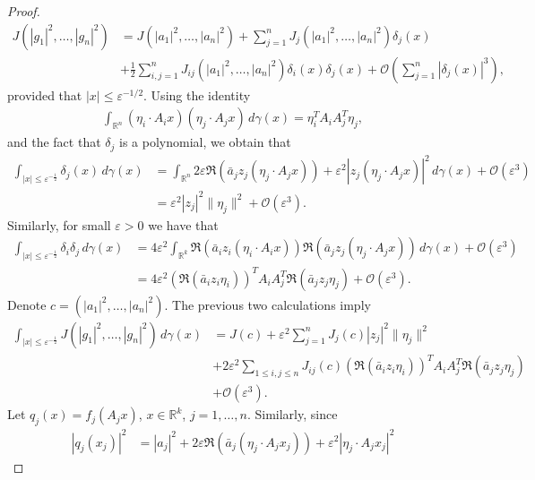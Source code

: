 \documentclass[10pt,a4paper]{amsart}
\newcommand{\R}{\mathbb{R}}
\begin{document}
\begin{proof}
		\begin{align*}
			J(|g_1|^2,\ldots,|g_n|^2)&= J(|a_1|^2,\ldots,|a_n|^2)  +\sum_{j=1}^n J_j(|a_1|^2,\ldots,|a_n|^2) \delta_j(x) \\
			&+ \frac{1}{2} \sum_{ i,j=1}^{n} J_{ij}(|a_1|^2,\ldots,|a_n|^2) \delta_i(x)\delta_j(x) + \mathcal{O}(\sum_{j=1}^n|\delta_j(x)|^3),   
		\end{align*}
		provided that $|x|\leq \varepsilon^{-1/2}$. Using the identity 
		\begin{align*}
			\int_{\R^n}(\eta_i\cdot A_ix)( \eta_j\cdot A_jx)\,d\gamma(x)=\eta_i^TA_iA_j^T \eta_j,
		\end{align*}
		and the fact that $\delta_j$ is a polynomial, we obtain that
		\begin{align*}
			\int_{| x|\leq \varepsilon^{-\frac{1}{2}}}\delta_j(x)\,d\gamma(x)&=\int_{\R^n}2\varepsilon \Re(\bar{a}_jz_j(\eta_j\cdot A_jx))+\varepsilon^2|z_j(\eta_j\cdot A_j x)|^2\,d\gamma(x)+ \mathcal{O}(\varepsilon^3)\\
			&=\varepsilon^2 |z_j|^2\|\eta_j\|^2 + \mathcal{O}(\varepsilon^3).
		\end{align*}
		Similarly, for small $\varepsilon>0$ we have that
		\begin{align*}
			\int_{| x|\leq \varepsilon^{-\frac{1}{2}}}\delta_i\delta_j\,d\gamma(x)
			&=  4\varepsilon^2\int_{\R^k}\Re(\bar{a}_iz_i(\eta_i\cdot A_ix)) \Re(\bar{a}_jz_j(\eta_j\cdot A_jx))\,d\gamma(x)+\mathcal{O}(\varepsilon^3)\\
			&= 4\varepsilon^{2} (\Re(\bar{a}_{i}z_{i}\eta_{i}))^{T} A_{i}A_{j}^{T} \Re(\bar{a}_{j}z_{j}\eta_{j}) + \mathcal{O}(\varepsilon^3).
		\end{align*} 
		Denote $c=(|a_1|^2,\ldots,|a_n|^2)$. The previous two calculations imply
		\begin{align*}
			\int_{| x|\leq \varepsilon^{-\frac{1}{2}}}J(|g_1|^2,\ldots,|g_n|^2)\,d\gamma(x)&= J(c)  +\varepsilon^2\sum_{j=1}^n J_j(c) |z_j|^2\|\eta_j\|^2\\
			&+ 2\varepsilon^2\sum_{1\leq i,j\leq n} J_{ij}(c)(\Re(\bar{a}_{i}z_{i}\eta_{i}))^{T} A_{i}A_{j}^{T} \Re(\bar{a}_{j}z_{j}\eta_{j})\\
   &+ \mathcal{O}(\varepsilon^3).
		\end{align*}
		Let $q_j(x)=f_j(A_jx)$, $x\in\R^k$, $j=1,\ldots,n$. Similarly,	since
		\begin{align*}
			|q_j(x_j)|^2&=|a_j|^2+2\varepsilon \Re(\bar{a}_j(\eta_j\cdot A_jx_j))+\varepsilon^2|\eta_j\cdot A_jx_j|^2
		\end{align*}

\end{proof}
\end{document}
